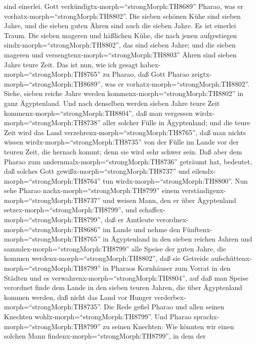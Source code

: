 sind einerlei. Gott verkündigtx-morph=``strongMorph:TH8689'' Pharao, was
er vorhatx-morph=``strongMorph:TH8802''.  Die sieben
schönen Kühe sind sieben Jahre, und die sieben guten Ähren sind auch die
sieben Jahre. Es ist einerlei Traum.  Die sieben mageren
und häßlichen Kühe, die nach jenen aufgestiegen
sindx-morph=``strongMorph:TH8802'', das sind sieben Jahre; und die
sieben mageren und versengtenx-morph=``strongMorph:TH8803'' Ähren sind
sieben Jahre teure Zeit.  Das ist nun, wie ich gesagt
habex-morph=``strongMorph:TH8765'' zu Pharao, daß Gott Pharao
zeigtx-morph=``strongMorph:TH8689'', was er
vorhatx-morph=``strongMorph:TH8802''.  Siehe, sieben reiche
Jahre werden kommenx-morph=``strongMorph:TH8802'' in ganz Ägyptenland.
 Und nach denselben werden sieben Jahre teure Zeit
kommenx-morph=``strongMorph:TH8804'', daß man vergessen
wirdx-morph=``strongMorph:TH8738'' aller solcher Fülle in Ägyptenland;
und die teure Zeit wird das Land
verzehrenx-morph=``strongMorph:TH8765'',  daß man nichts
wissen wirdx-morph=``strongMorph:TH8735'' von der Fülle im Lande vor der
teuren Zeit, die hernach kommt; denn sie wird sehr schwer sein.
 Daß aber dem Pharao zum
andernmalx-morph=``strongMorph:TH8736'' geträumt hat, bedeutet, daß
solches Gott gewißx-morph=``strongMorph:TH8737'' und
eilendx-morph=``strongMorph:TH8764'' tun
wirdx-morph=``strongMorph:TH8800''.  Nun sehe Pharao
nachx-morph=``strongMorph:TH8799'' einem
verständigenx-morph=``strongMorph:TH8737'' und weisen Mann, den er über
Ägyptenland setzex-morph=``strongMorph:TH8799'',  und
schaffex-morph=``strongMorph:TH8799'', daß er Amtleute
verordnex-morph=``strongMorph:TH8686'' im Lande und nehme den
Fünftenx-morph=``strongMorph:TH8765'' in Ägyptenland in den sieben
reichen Jahren  und sammlex-morph=``strongMorph:TH8799''
alle Speise der guten Jahre, die kommen
werdenx-morph=``strongMorph:TH8802'', daß sie Getreide
aufschüttenx-morph=``strongMorph:TH8799'' in Pharaos Kornhäuser zum
Vorrat in den Städten und es verwahrenx-morph=``strongMorph:TH8804'',
 auf daß man Speise verordnet finde dem Lande in den sieben
teuren Jahren, die über Ägyptenland kommen werden, daß nicht das Land
vor Hunger verderbex-morph=``strongMorph:TH8735''.  Die
Rede gefiel Pharao und allen seinen Knechten
wohlx-morph=``strongMorph:TH8799''.  Und Pharao
sprachx-morph=``strongMorph:TH8799'' zu seinen Knechten: Wie könnten wir
einen solchen Mann findenx-morph=``strongMorph:TH8799'', in dem der
